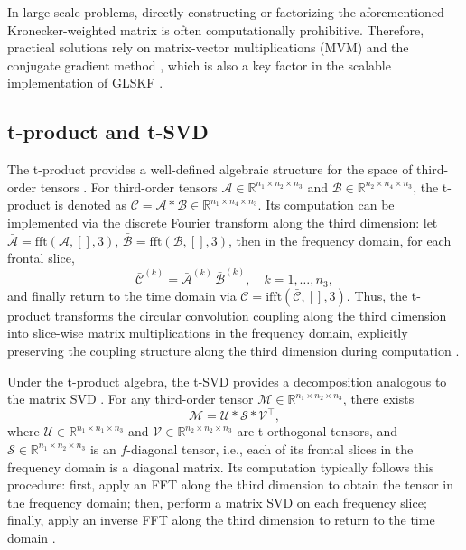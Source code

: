 \documentclass[a4paper,12pt]{article}
\numberwithin{equation}{section}
\numberwithin{algorithm}{section}
\theoremstyle{remark}
\theoremstyle{definition}
\begin{document}
In large-scale problems, directly constructing or factorizing the aforementioned Kronecker-weighted matrix is often computationally prohibitive. Therefore, practical solutions rely on matrix-vector multiplications (MVM) and the conjugate gradient method \cite{hestenes1952cg}, which is also a key factor in the scalable implementation of GLSKF \cite{lei2024glskf}.






\subsection{ t-product and  t-SVD}
The  t-product provides a well-defined algebraic structure for the space of third-order tensors \cite{kilmer2011factorization, kilmer2013operators}.
For third-order tensors $\mathcal{A}\in\mathbb{R}^{n_1\times n_2\times n_3}$ and $\mathcal{B}\in\mathbb{R}^{n_2\times n_4\times n_3}$,
the  t-product is denoted as $\mathcal{C}=\mathcal{A}*\mathcal{B}\in\mathbb{R}^{n_1\times n_4\times n_3}$.
Its computation can be implemented via the discrete Fourier transform along the third dimension: let $\bar{\mathcal{A}}=\mathrm{fft}(\mathcal{A},[],3)$,
$\bar{\mathcal{B}}=\mathrm{fft}(\mathcal{B},[],3)$, then in the frequency domain, for each frontal slice,
\[
\bar{\mathcal{C}}^{(k)}=\bar{\mathcal{A}}^{(k)}\,\bar{\mathcal{B}}^{(k)},\quad k=1,\ldots,n_3,
\label{eq:tprod_fft}
\]
and finally return to the time domain via $\mathcal{C}=\mathrm{ifft}(\bar{\mathcal{C}},[],3)$. Thus, the  t-product transforms the circular convolution coupling along the third dimension into slice-wise matrix multiplications in the frequency domain, explicitly preserving the coupling structure along the third dimension during computation \cite{kilmer2013operators}.




Under the  t-product algebra, the  t-SVD provides a decomposition analogous to the matrix SVD \cite{kilmer2011factorization, zhang2017tsvd}.
For any third-order tensor $\mathcal{M}\in\mathbb{R}^{n_1\times n_2\times n_3}$, there exists
\[
\mathcal{M}=\mathcal{U}*\mathcal{S}*\mathcal{V}^{\top},
\label{eq:tsvd}
\]
where $\mathcal{U}\in\mathbb{R}^{n_1\times n_1\times n_3}$ and $\mathcal{V}\in\mathbb{R}^{n_2\times n_2\times n_3}$ are  t-orthogonal tensors,
and $\mathcal{S}\in\mathbb{R}^{n_1\times n_2\times n_3}$ is an $f$-diagonal tensor, i.e., each of its frontal slices in the frequency domain is a diagonal matrix.
Its computation typically follows this procedure: first, apply an FFT along the third dimension to obtain the tensor in the frequency domain; then, perform a matrix SVD on each frequency slice; finally, apply an inverse FFT along the third dimension to return to the time domain \cite{kilmer2013operators, zhang2017tsvd}.
\end{document}
